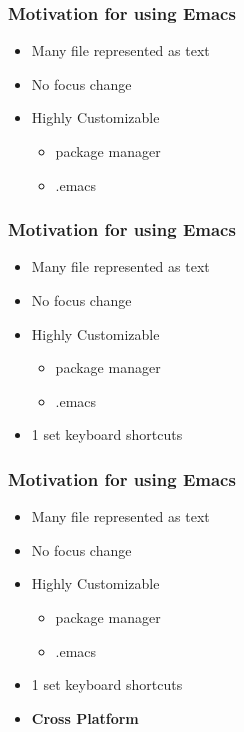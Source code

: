 \documentclass[t,10pt]{beamer}
\begin{document}
\begin{frame}
\frametitle{Motivation for using Emacs}
\label{sec-1-6}

\begin{itemize}
\item Many file represented as text
\item No focus change
\item Highly Customizable
\begin{itemize}
\item package manager
\item .emacs
\end{itemize}
\end{itemize}
\end{frame}
\begin{frame}
\frametitle{Motivation for using Emacs}
\label{sec-1-7}

\begin{itemize}
\item Many file represented as text
\item No focus change
\item Highly Customizable
\begin{itemize}
\item package manager
\item .emacs
\end{itemize}
\item 1 set keyboard shortcuts
\end{itemize}
\end{frame}
\begin{frame}
\frametitle{Motivation for using Emacs}
\label{sec-1-8}

\begin{itemize}
\item Many file represented as text
\item No focus change
\item Highly Customizable
\begin{itemize}
\item package manager
\item .emacs
\end{itemize}
\item 1 set keyboard shortcuts
\item \textbf{Cross Platform}
\end{itemize}
\end{frame}
\end{document}
